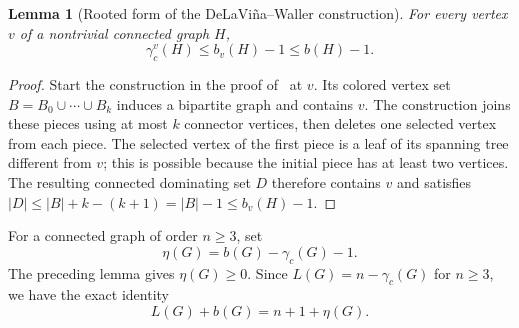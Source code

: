 \documentclass[11pt,a4paper]{article}
\newtheorem{lemma}[theorem]{Lemma}
\theoremstyle{remark}
\begin{document}
\begin{lemma}[Rooted form of the DeLaVi\~na--Waller construction]
\label{r8:lem-rooted-bipartite}
For every vertex $v$ of a nontrivial connected graph $H$,
\[
 \gamma_c^v(H)\le b_v(H)-1\le b(H)-1.
\]
\end{lemma}
\begin{proof}
Start the construction in the proof of~\cite[Theorem~4]{R8DW2008}
at $v$.  Its colored vertex set $B=B_0\cup\cdots\cup B_k$ induces a
bipartite graph and contains $v$.  The construction joins these pieces
using at most $k$ connector vertices, then deletes one selected vertex
from each piece.  The selected vertex of the first piece is a leaf of
its spanning tree different from $v$; this is possible because the
initial piece has at least two vertices.  The resulting connected
dominating set $D$ therefore contains $v$ and satisfies
$|D|\le |B|+k-(k+1)=|B|-1\le b_v(H)-1$.
\end{proof}

For a connected graph of order $n\ge3$, set
\[
 \eta(G)=b(G)-\gamma_c(G)-1.
\]
The preceding lemma gives $\eta(G)\ge0$.  Since
$L(G)=n-\gamma_c(G)$ for $n\ge3$, we have the exact identity
\begin{equation}\label{r8:eq-leaf-slack}
 L(G)+b(G)=n+1+\eta(G).
\end{equation}
\end{document}
